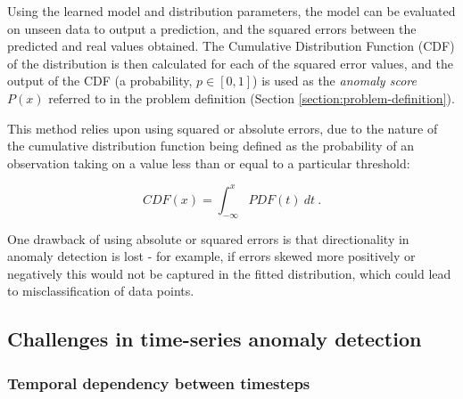 \documentclass{mpaper}
\begin{document}
Using the learned model and distribution parameters, the model can be evaluated on unseen data to output a prediction, and the squared errors between the predicted and real values obtained. The Cumulative Distribution Function (CDF) of the distribution is then calculated for each of the squared error values, and the output of the CDF (a probability, $p \in [0,1]$) is used as the \textit{anomaly score} $P(x)$ referred to in the problem definition (Section \ref{section:problem-definition}).

This method relies upon using squared or absolute errors, due to the nature of the cumulative distribution function being defined as the probability of an observation taking on a value less than or equal to a particular threshold:

$$CDF(x) = \int_{-\infty}^{x} PDF(t) \: dt \: .$$

One drawback of using absolute or squared errors is that directionality in anomaly detection is lost - for example, if errors skewed more positively or negatively this would not be captured in the fitted distribution, which could lead to misclassification of data points.


\subsection{Challenges in time-series anomaly detection}

\subsubsection{Temporal dependency between timesteps}
\label{section:temporal-dependency}

\end{document}

